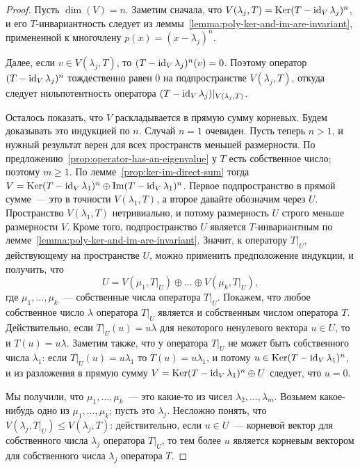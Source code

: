 \begin{proof}
Пусть $\dim(V) = n$.
Заметим сначала, что $V(\lambda_j,T) = \operatorname{Ker}(T-\operatorname{id}_V\lambda_j)^n$,
и его $T$-инвариантность следует из
леммы~\ref{lemma:poly-ker-and-im-are-invariant}, примененной
к многочлену $p(x) = (x-\lambda_j)^n$.

Далее, если $v\in V(\lambda_j,T)$, то $(T-\operatorname{id}_V\lambda_j)^n(v) = 0$.
Поэтому оператор $(T-\operatorname{id}_V\lambda_j)^n$ тождественно равен $0$
на подпространстве $V(\lambda_j,T)$, откуда следует нильпотентность
оператора $(T-\operatorname{id}_V\lambda_j)|_{V(\lambda_j,T)}$.

Осталось показать, что $V$ раскладывается в прямую сумму корневых.
Будем доказывать это индукцией по $n$. Случай $n=1$ очевиден.
Пусть теперь $n>1$, и нужный результат верен для всех пространств
меньшей размерности.
По предложению~\ref{prop:operator-has-an-eigenvalue}
у $T$ есть собственное число; поэтому $m\geq 1$.
По лемме~\ref{prop:ker-im-direct-sum}
тогда $V = \operatorname{Ker}(T-\operatorname{id}_V\lambda_1)^n \oplus \operatorname{Im}(T-\operatorname{id}_V\lambda_1)^n$.
Первое подпространство в прямой сумме~--- это в точности
$V(\lambda_1,T)$, а второе давайте обозначим через $U$.
Пространство $V(\lambda_1,T)$ нетривиально, и потому
размерность $U$ строго меньше размерности $V$.
Кроме того, подпространство $U$ является $T$-инвариантным по
лемме~\ref{lemma:poly-ker-and-im-are-invariant}.
Значит, к оператору $T|_U$, действующему на пространстве $U$,
можно применить предположение индукции, и получить, что
$$
U = V(\mu_1,T|_U)\oplus\dots \oplus V(\mu_k,T|_U),
$$
где $\mu_1,\dots,\mu_k$~--- собственные числа оператора
$T|_U$. Покажем, что любое собственное число $\lambda$ оператора $T|_U$
является и собственным числом оператора $T$. Действительно,
если $T|_U(u)=u\lambda$ для некоторого ненулевого вектора $u\in U$,
то и $T(u) = u\lambda$. Заметим также, что у оператора $T|_U$
не может быть собственного числа $\lambda_1$:
если $T|_U(u)=u\lambda_1$ то $T(u) = u\lambda_1$, и потому
$u\in \operatorname{Ker}(T-\operatorname{id}_V\lambda_1)^n$, и из разложения в прямую сумму
$V = \operatorname{Ker}(T-\operatorname{id}_V\lambda_1)^n\oplus U$ следует, что $u=0$.

Мы получили, что $\mu_1,\dots,\mu_k$~--- это какие-то из чисел
$\lambda_2,\dots,\lambda_m$. Возьмем какое-нибудь одно из
$\mu_1,\dots,\mu_k$; пусть это $\lambda_j$.
Несложно понять, что $V(\lambda_j,T|_U) \leq V(\lambda_j,T)$:
действительно, если $u\in U$~--- корневой вектор для собственного
числа $\lambda_j$ оператора $T|_U$, то тем более
$u$ является корневым вектором для собственного числа $\lambda_j$
оператора $T$.


\end{proof}
